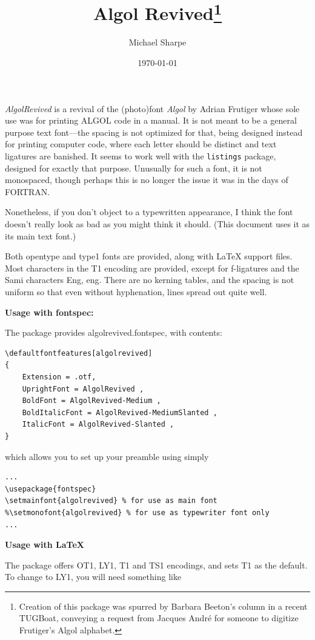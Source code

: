 \documentclass[11pt]{article}
\title{Algol Revived\footnote{Creation of this package was spurred by Barbara Beeton's column in a recent TUGBoat, conveying a request from Jacques Andr\'e for someone to digitize Frutiger's Algol alphabet.}}
\author{Michael Sharpe}
\date{\today}  %
\begin{document}
\maketitle
\emph{AlgolRevived} is a revival of the (photo)font \emph{Algol} by Adrian Frutiger  whose sole use was for printing ALGOL code in a manual.  It  is not meant to be a general purpose text font---the spacing is not optimized for that, being designed instead for printing computer code, where each letter should be distinct and text ligatures are banished. It seems to work well with the {\tt listings} package, designed for exactly that purpose. Unusually for such a font, it is not monospaced, though perhaps this is no longer the issue it was in the days of FORTRAN. 

Nonetheless, if you don't object to a typewritten appearance, I think the font doesn't really look as bad as you might think it should. (This document uses it as its main text font.)

Both opentype and type1 fonts are provided, along with LaTeX support files. Most characters in the T1 encoding are provided, except for f-ligatures and the Sami characters Eng, eng. There are no kerning tables, and the spacing is not uniform so that even without hyphenation, lines spread out quite well.

\textbf{Usage with fontspec:}

The package provides algolrevived.fontspec, with contents:

\begin{verbatim}
\defaultfontfeatures[algolrevived]
{
	Extension = .otf,
	UprightFont = AlgolRevived ,
	BoldFont = AlgolRevived-Medium ,
	BoldItalicFont = AlgolRevived-MediumSlanted ,
	ItalicFont = AlgolRevived-Slanted ,
}
\end{verbatim}
which allows you to set up your preamble using simply
\begin{verbatim}
...
\usepackage{fontspec}
\setmainfont{algolrevived} % for use as main font
%\setmonofont{algolrevived} % for use as typewriter font only
...
\end{verbatim}
\newpage

\textbf{Usage with LaTeX}

The package offers OT1, LY1, T1 and TS1 encodings, and sets T1 as the default. To change to LY1, you will need something like
\end{document}
